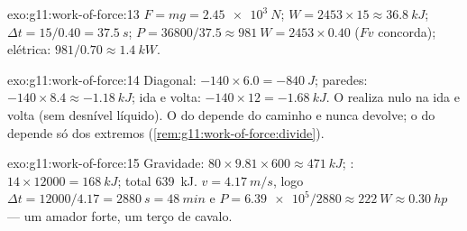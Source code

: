 \begin{solution}{exo:g11:work-of-force:13}
$F = mg = \qty{2.45e3}{N}$; $W = 2453 \times 15 \approx \qty{36.8}{kJ}$;
$\Delta t = 15/0.40 = \qty{37.5}{s}$;
$P = 36800/37.5 \approx \qty{981}{W} = 2453 \times 0.40$ ($Fv$
concorda); elétrica: $981/0.70 \approx \qty{1.4}{kW}$.
\end{solution}

\begin{solution}{exo:g11:work-of-force:14}
Diagonal: $-140 \times 6.0 = -\qty{840}{J}$; paredes:
$-140 \times 8.4 \approx -\qty{1.18}{kJ}$; ida e volta:
$-140 \times 12 = -\qty{1.68}{kJ}$. O  realiza  nulo na ida e
volta (sem desnível líquido). O  do  depende do caminho e
nunca devolve; o do  depende só dos extremos
(\cref{rem:g11:work-of-force:divide}).
\end{solution}

\begin{solution}{exo:g11:work-of-force:15}
Gravidade: $80 \times 9.81 \times 600 \approx \qty{471}{kJ}$; :
$14 \times 12000 = \qty{168}{kJ}$; total \qty{639}{kJ}.
$v = \qty{4.17}{m/s}$, logo
$\Delta t = 12000/4.17 = \qty{2880}{s} = \qty{48}{min}$ e
$P = \num{6.39e5}/2880 \approx \qty{222}{W} \approx \qty{0.30}{hp}$ ---
um amador forte, um terço de cavalo.
\end{solution}

